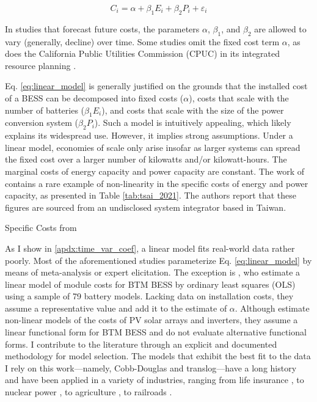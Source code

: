 \documentclass[preprint,12pt,authoryear]{elsarticle}
\begin{document}
\begin{equation}\label{eq:linear_model}
    C_i = \alpha + \beta_{1} E_i + \beta_{2} P_i + \varepsilon_i
\end{equation}

In studies that forecast future costs, the parameters $\alpha$, $\beta_1$, and $\beta_2$ are allowed to vary (generally, decline) over time. Some studies \citep{schmidt2019,comello2019} omit the fixed cost term $\alpha$, as does the California Public Utilities Commission (CPUC) in its integrated resource planning . 

Eq. \ref{eq:linear_model} is generally justified on the grounds that the installed cost of a BESS can be decomposed into fixed costs ($\alpha$), costs that scale with the number of batteries ($\beta_1 E_i$), and costs that scale with the size of the power conversion system ($\beta_2 P_i$). Such a model is intuitively appealing, which likely explains its widespread use. However, it implies strong assumptions. Under a linear model, economies of scale only arise insofar as larger systems can spread the fixed cost over a larger number of kilowatts and/or kilowatt-hours. The marginal costs of energy capacity and power capacity are constant. The work of \citet{tsai2020} contains a rare example of non-linearity in the specific costs of energy and power capacity, as presented in Table \ref{tab:tsai_2021}. The authors report that these figures are sourced from an undisclosed system integrator based in Taiwan.

\begin{table}[h!]
\centering
\caption{Specific Costs from \citet[][p. 203,739]{tsai2020}}\label{tab:tsai_2021}
\end{table}

As I show in \ref{apdx:time_var_coef}, a linear model fits real-world data rather poorly. Most of the aforementioned studies parameterize Eq. \ref{eq:linear_model} by means of meta-analysis or expert elicitation. The exception is \citet{dietrich2018}, who estimate a linear model of module costs for BTM BESS by ordinary least squares (OLS) using a sample of 79 battery models. Lacking data on installation costs, they assume a representative value and add it to the estimate of $\alpha$.  Although \citet{dietrich2018} estimate non-linear models of the costs of PV solar arrays and inverters, they assume a linear functional form for BTM BESS and do not evaluate alternative functional forms. I contribute to the literature through an explicit and documented methodology for model selection. The models that exhibit the best fit to the data I rely on this work---namely, Cobb-Douglas and translog---have a long history \citep{cobbdouglas1928, kmenta1967} and have been applied in a variety of industries, ranging from life insurance \citep{segal2003}, to nuclear power \citep{berthelemy2015}, to agriculture \citep{ray1982}, to railroads \citep{bogart2010}.
\end{document}
